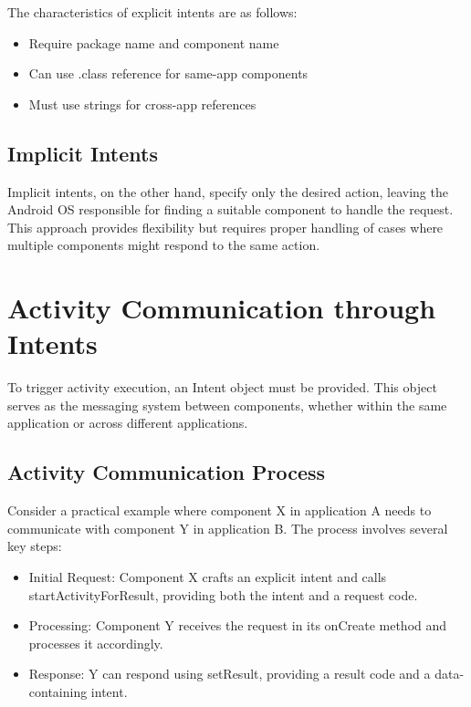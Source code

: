 \documentclass{article}
\begin{document}
The characteristics of explicit intents are as follows:

\begin{itemize}
\item Require package name and component name
\item Can use .class reference for same-app components
\item Must use strings for cross-app references
\end{itemize}

\subsection{Implicit Intents}

Implicit intents, on the other hand, specify only the desired action, leaving the Android OS responsible for finding a suitable component to handle the request. This approach provides flexibility but requires proper handling of cases where multiple components might respond to the same action.

\section{Activity Communication through Intents}
To trigger activity execution, an Intent object must be provided. This object serves as the messaging system between components, whether within the same application or across different applications. 

\subsection{Activity Communication Process}
Consider a practical example where component X in application A needs to communicate with component Y in application B. The process involves several key steps:

\begin{itemize}
    \item Initial Request:
    Component X crafts an explicit intent and calls startActivityForResult, providing both the intent and a request code.
    
    \item Processing:
    Component Y receives the request in its onCreate method and processes it accordingly.
    
    \item Response:
    Y can respond using setResult, providing a result code and a data-containing intent.
\end{itemize}
\end{document}
